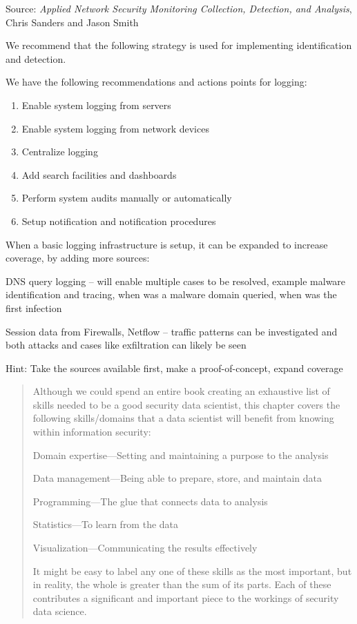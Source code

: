 \documentclass[Screen16to9,17pt]{foils}
\begin{document}
Source: \emph{Applied Network Security Monitoring Collection, Detection, and Analysis}, Chris Sanders and Jason Smith


We recommend that the following strategy is used for implementing identification and detection.

We have the following recommendations and actions points for logging:
\begin{enumerate}
\item[\faSquareO] Enable system logging from servers
\item[\faSquareO] Enable system logging from network devices
\item[\faSquareO] Centralize logging
\item[\faSquareO] Add search facilities and dashboards
\item[\faSquareO] Perform system audits manually or automatically
\item[\faSquareO] Setup notification and notification procedures
\end{enumerate}

When a basic logging infrastructure is setup, it can be expanded to increase coverage, by
adding more sources:

\begin{list2}
\item DNS query logging -- will enable multiple cases to be resolved, example malware identification and tracing, when was a malware domain queried, when was the first infection
\item Session data from Firewalls, Netflow -- traffic patterns can be investigated and both attacks and cases like exfiltration can likely be seen
\end{list2}

Hint: Take the sources available first, make a proof-of-concept, expand coverage


\begin{quote}
Although we could spend an entire book creating an exhaustive list of skills needed to be a good security data scientist, this chapter covers the following skills/domains that a data scientist will benefit from
knowing within information security:
\begin{list2}
\item Domain expertise—Setting and maintaining a purpose to the analysis
\item Data management—Being able to prepare, store, and maintain data
\item Programming—The glue that connects data to analysis
\item Statistics—To learn from the data
\item Visualization—Communicating the results effectively
\end{list2}
It might be easy to label any one of these skills as the most important, but in reality, the whole is greater than the sum of its parts. Each of these contributes a significant and important piece to the workings of
security data science.
\end{quote}
\end{document}
